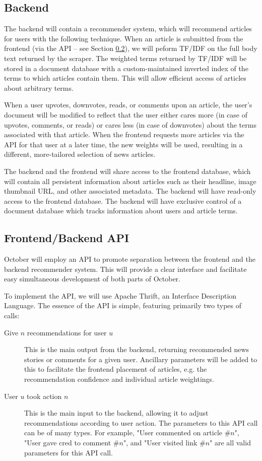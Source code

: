 \documentclass[11pt,letterpaper]{article}
\begin{document}
\subsection{Backend}
\label{sec:backend-implementation}
The backend will contain a recommender system, which will recommend articles for users with the following technique.
When an article is submitted from the frontend (via the API -- see Section \ref{sec:api}), we will peform TF/IDF\cite{tfidf} on the full body text returned by the scraper.
The weighted terms returned by TF/IDF will be stored in a document database with a custom-maintained inverted index of the terms to which articles contain them.
This will allow efficient access of articles about arbitrary terms.

When a user upvotes, downvotes, reads, or comments upon an article, the user's document will be modified to reflect that the user either cares more (in case of upvotes, comments, or reads) or cares less (in case of downvotes) about the terms associated with that article.
When the frontend requests more articles via the API for that user at a later time, the new weights will be used, resulting in a different, more-tailored selection of news articles.

The backend and the frontend will share access to the frontend database, which will contain all persistent information about articles such as their headline, image thumbnail URL, and other associated metadata.
The backend will have read-only access to the frontend database.
The backend will have exclusive control of a document database which tracks information about users and article terms.

\subsection{Frontend/Backend API}
\label{sec:api}
October will employ an API to promote separation between the frontend and the backend recommender system.
This will provide a clear interface and facilitate easy simultaneous development of both parts of October.

To implement the API, we will use Apache Thrift, an Interface Description Language\cite{thrift}.
The essence of the API is simple, featuring primarily two types of calls:
\begin{description}
\item[Give $n$ recommendations for user $u$]
This is the main output from the backend, returning recommended news stories or comments for a given user.
Ancillary parameters will be added to this to facilitate the frontend placement of articles, e.g. the recommendation confidence and individual article weightings.
\item[User $u$ took action $n$]
This is the main input to the backend, allowing it to adjust recommendations according to user action.
The parameters to this API call can be of many types. For example, "User commented on article \#$n$", "User gave cred to comment \#$n$", and "User visited link \#$n$" are all valid parameters for this API call.
\end{description}
\end{document}

